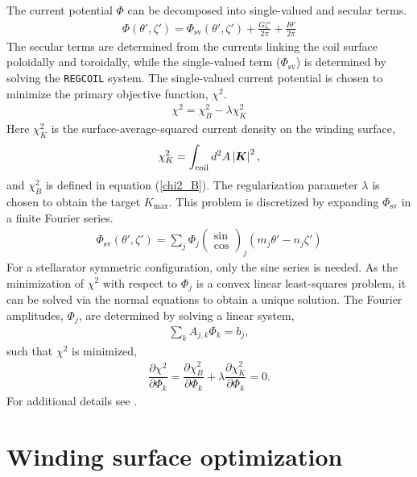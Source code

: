 \documentclass[aps,unsortedaddress]{revtex4-1}
\newcommand{\partder}[2]{\dfrac{\partial  #1}{\partial  #2}}
\begin{document}
The current potential $\Phi$ can be decomposed into single-valued and secular terms.
\begin{gather}
\Phi(\theta', \zeta') = \Phi_{\text{sv}}(\theta',\zeta') + \frac{ G \zeta'}{2 \pi} + \frac{I \theta'}{2 \pi}
\end{gather}
The secular terms are determined from the currents linking the coil surface poloidally and toroidally, while the single-valued term ($\Phi_{\text{sv}}$) is determined by solving the \texttt{REGCOIL} system. The single-valued current potential is chosen to minimize the primary objective function, $\chi^2$.
\begin{gather}
\chi^2 = \chi^2_B - \lambda \chi^2_K
\label{primary_objective}
\end{gather}
Here $\chi^2_K$ is the surface-average-squared current density on the winding surface,
\begin{gather}
\chi^2_K = \int_{\text{coil}} d^2A \, \abs{\bm{K}}^2,
\end{gather}
and $\chi^2_B$ is defined in equation (\ref{chi2_B}). The regularization parameter $\lambda$ is chosen to obtain the target $K_{\text{max}}$. This problem is discretized by expanding $\Phi_{\text{sv}}$ in a finite Fourier series.
\begin{gather}
\Phi_{\text{sv}}(\theta',\zeta') = \sum_j \Phi_j \left( \begin{array}{c} \sin \\ \cos \end{array} \right)_j (m_j \theta' - n_j \zeta')
\end{gather}
For a stellarator symmetric configuration, only the sine series is needed. As the minimization of $\chi^2$ with respect to $\Phi_{j}$ is a convex linear least-squares problem, it can be solved via the normal equations to obtain a unique solution. The Fourier amplitudes, $\Phi_j$, are determined by solving a linear system,
\begin{gather}
\sum_k A_{j,k} \Phi_k = b_j,
\label{forward}
\end{gather}
such that $\chi^2$ is minimized,
\begin{gather}
\partder{\chi^2}{\Phi_k} = \partder{\chi^2_B}{\Phi_k} + \lambda \partder{\chi^2_K}{\Phi_k} = 0.
\label{regcoil_minimization}
\end{gather}
For additional details see \cite{Landreman2017}.

\section{Winding surface optimization}
\label{sect_opt}
\FloatBarrier
\end{document}

